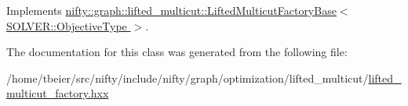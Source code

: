 Implements \hyperlink{classnifty_1_1graph_1_1lifted__multicut_1_1LiftedMulticutFactoryBase_a97ff4e5f55ec719e1292b80a46705923}{nifty\+::graph\+::lifted\+\_\+multicut\+::\+Lifted\+Multicut\+Factory\+Base$<$ S\+O\+L\+V\+E\+R\+::\+Objective\+Type $>$}.



The documentation for this class was generated from the following file\+:\begin{DoxyCompactItemize}
\item 
/home/tbeier/src/nifty/include/nifty/graph/optimization/lifted\+\_\+multicut/\hyperlink{lifted__multicut__factory_8hxx}{lifted\+\_\+multicut\+\_\+factory.\+hxx}\end{DoxyCompactItemize}
